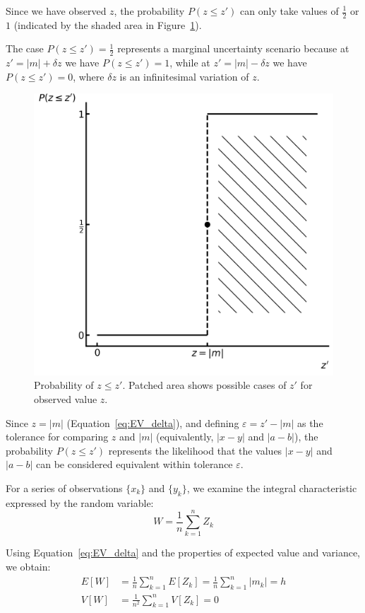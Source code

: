 \documentclass[12pt,a4paper]{article}
\theoremstyle{definition}
\begin{document}
Since we have observed $z$, the probability $P(z \leq z')$ can only take values of $\frac{1}{2}$ or $1$ (indicated by the shaded area in Figure~\ref{fig:P_deltas}).

The case $P(z \leq z') = \frac{1}{2}$ represents a marginal uncertainty scenario because at $z' = |m| + \delta z$ we have $P(z \leq z') = 1$, while at $z' = |m| - \delta z$ we have $P(z \leq z') = 0$, where $\delta z$ is an infinitesimal variation of $z$.

\begin{figure}[H]
	\centering
	\includegraphics[width=0.5\linewidth]{img/P_deltas}
	\caption{Probability of $z \leq z'$. Patched area shows possible cases of $z'$ for observed value $z$.}
	\label{fig:P_deltas}
\end{figure}

Since $z=|m|$ (Equation~\ref{eq:EV_delta}), and defining $\varepsilon = z' - |m|$ as the tolerance for comparing $z$ and $|m|$ (equivalently, $|x-y|$ and $|a-b|$), the probability $P(z \leq z')$ represents the likelihood that the values $|x-y|$ and $|a-b|$ can be considered equivalent within tolerance $\varepsilon$.

For a series of observations $\{x_k\}$ and $\{y_k\}$, we examine the integral characteristic expressed by the random variable:
\begin{equation}
	W = \frac{1}{n} \sum\limits_{k=1}^{n} Z_k
	\label{eq:W}
\end{equation}

Using Equation~\ref{eq:EV_delta} and the properties of expected value and variance, we obtain:
\begin{equation}
	\begin{aligned}
		E\left[W\right] &= \frac{1}{n}\sum\limits_{k=1}^{n} E[Z_k] = \frac{1}{n}\sum\limits_{k=1}^{n} |m_k| = h\\
		V\left[W\right] &= \frac{1}{n^2}\sum\limits_{k=1}^{n} V[Z_k] = 0
		\label{eq:EV_Wdelta}
	\end{aligned}
\end{equation}
\end{document}
